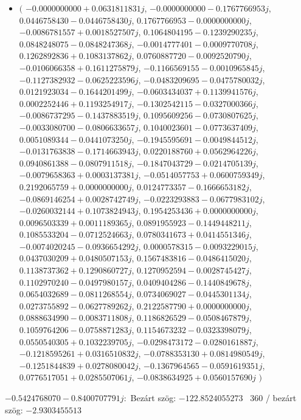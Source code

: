 \documentclass[14pt,a4paper]{article}
\begin{document}
\begin{itemize}
\item
$\big($
$-0.0000000000+0.0631811831j$, $-0.0000000000-0.1767766953j$, $0.0446758430-0.0446758430j$, $0.1767766953-0.0000000000j$, $-0.0086781557+0.0018527507j$, $0.1064804195-0.1239290235j$, $0.0848248075-0.0848247368j$, $-0.0014777401-0.0009770708j$, $0.1262892836+0.1083137862j$, $0.0760887720-0.0092520790j$, $-0.0106066358+0.1611275879j$, $-0.1166569155-0.0010965845j$, $-0.1127382932-0.0625223596j$, $-0.0483209695-0.0475780032j$, $0.0121923034-0.1644201499j$, $-0.0603434037+0.1139941576j$, $0.0002252446+0.1193254917j$, $-0.1302542115-0.0327000366j$, $-0.0086737295-0.1437883519j$, $0.1095609256-0.0730807625j$, $-0.0033080700-0.0806633657j$, $0.1040023601-0.0773637409j$, $0.0051089344-0.0441073250j$, $-0.1945595691-0.0049844512j$, $-0.0131763838-0.1714663943j$, $0.0220188760+0.0562964226j$, $0.0940861388-0.0807911518j$, $-0.1847043729-0.0214705139j$, $-0.0079658363+0.0003137381j$, $-0.0514057753+0.0600759349j$, $0.2192065759+0.0000000000j$, $0.0124773357-0.1666653182j$, $-0.0869146254+0.0028742749j$, $-0.0223293883-0.0677983102j$, $-0.0260032144+0.1073824943j$, $0.1954253436+0.0000000000j$, $0.0096503339+0.0011189365j$, $0.0891955923-0.1449448211j$, $0.1085533204-0.0712524663j$, $0.0780341673+0.0414551346j$, $-0.0074020245-0.0936654292j$, $0.0000578315-0.0093229015j$, $0.0437030209+0.0480507153j$, $0.1567483816-0.0486415020j$, $0.1138737362+0.1290860727j$, $0.1270952594-0.0028745427j$, $0.1102970240-0.0497980157j$, $0.0409404286-0.1440849678j$, $0.0654032689-0.0811268554j$, $0.0734069027-0.0445301134j$, $0.0273755892-0.0627789262j$, $0.2122587790+0.0000000000j$, $0.0888634990-0.0083711808j$, $0.1186826529-0.0508467879j$, $0.1059764206-0.0758871283j$, $0.1154673232-0.0323398079j$, $0.0550540305+0.1032239705j$, $-0.0298473172-0.0280161887j$, $-0.1218595261+0.0316510832j$, $-0.0788353130+0.0814980549j$, $-0.1251844839+0.0278080042j$, $-0.1367964565-0.0591619351j$, $0.0776517051+0.0285507061j$, $-0.0838634925+0.0560157690j$
$\big)$
\end{itemize}
$-0.5424768070-0.8400707791j$:\
Bezárt szög: $-122.8524055273$ \
360 / bezárt szög: $-2.9303455513$\
\end{document}
